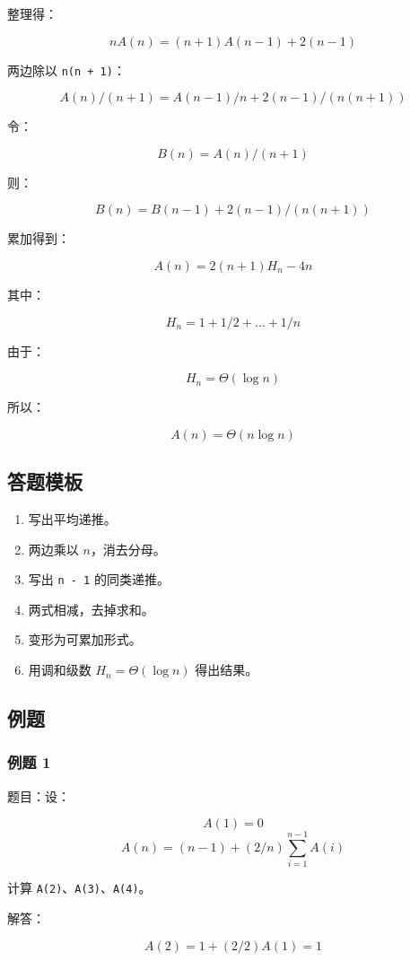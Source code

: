 \documentclass[UTF8,zihao=-4]{ctexart}
\begin{document}
整理得：

\[nA(n) = (n + 1)A(n - 1) + 2(n - 1)\]

两边除以 \texttt{n(n + 1)}：

\[A(n)/(n + 1) = A(n - 1)/n + 2(n - 1)/(n(n + 1))\]

令：

\[B(n) = A(n)/(n + 1)\]

则：

\[B(n) = B(n - 1) + 2(n - 1)/(n(n + 1))\]

累加得到：

\[A(n) = 2(n + 1)H_{n} - 4n\]

其中：

\[H_{n} = 1 + 1/2 + ... + 1/n\]

由于：

\[H_{n} = \Theta(\log n)\]

所以：

\[A(n) = \Theta(n \log n)\]

\subsection*{答题模板}

\begin{enumerate}
\item 写出平均递推。
\item 两边乘以 $n$，消去分母。
\item 写出 \texttt{n - 1} 的同类递推。
\item 两式相减，去掉求和。
\item 变形为可累加形式。
\item 用调和级数 $H_n = \Theta(\log n)$ 得出结果。
\end{enumerate}

\subsection*{例题}

\subsubsection*{例题 1}

题目：设：

\[A(1) = 0\]
\[A(n) = (n - 1) + (2/n) \sum_{i=1}^{n-1} A(i)\]

计算 \texttt{A(2)}、\texttt{A(3)}、\texttt{A(4)}。

解答：

\[A(2) = 1 + (2/2)A(1) = 1\]
\end{document}
